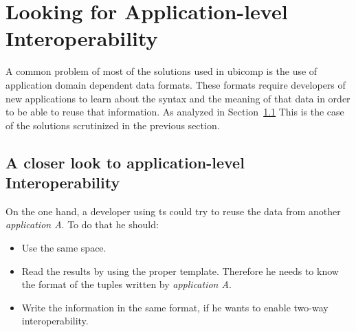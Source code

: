 \section{Looking for Application-level Interoperability}
\label{sec:interoperability}

A common problem of most of the solutions used in \ac{ubicomp} is the use of application domain dependent data formats.
These formats require developers of new applications to learn about the syntax and the meaning of that data in order to be able to reuse that information.
As analyzed in Section~\ref{sec:closer} This is the case of the solutions scrutinized in the previous section.


\subsection{A closer look to application-level Interoperability}
\label{sec:closer}

On the one hand, a developer using \ac{ts} could try to reuse the data from another \emph{application A}.
To do that he should:
\begin{itemize}
 \item Use the same space.%
 \item Read the results by using the proper template.
	Therefore he needs to know the format of the tuples written by  \emph{application A}.
 \item Write the information in the same format, if he wants to enable two-way interoperability.

\end{itemize}

